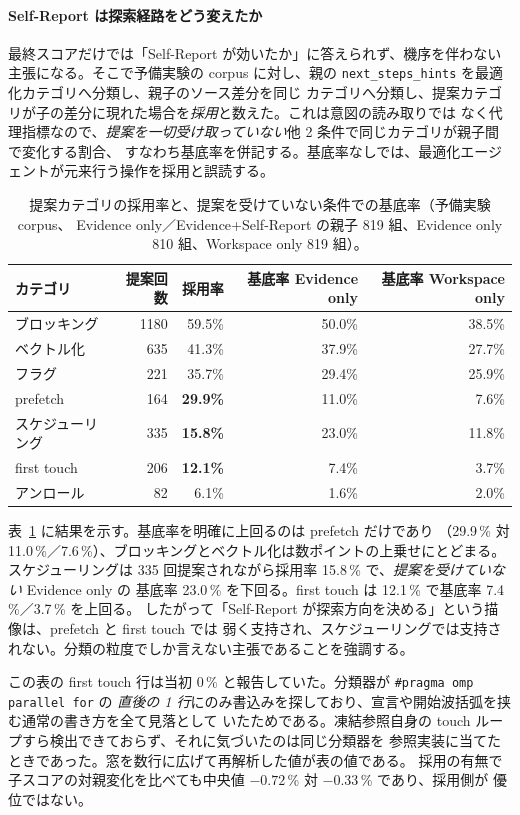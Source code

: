\documentclass[conference,letterpaper]{IEEEtran}
\newcommand{\armW}{Workspace only}
\newcommand{\armE}{Evidence only}
\newcommand{\armS}{Evidence+Self-Report}
\begin{document}
\paragraph{Self-Report は探索経路をどう変えたか}
最終スコアだけでは「Self-Report が効いたか」に答えられず、機序を伴わない主張になる。そこで予備実験の
corpus に対し、親の \texttt{next\_steps\_hints} を最適化カテゴリへ分類し、親子のソース差分を同じ
カテゴリへ分類し、提案カテゴリが子の差分に現れた場合を\emph{採用}と数えた。これは意図の読み取りでは
なく代理指標なので、\emph{提案を一切受け取っていない}他 2 条件で同じカテゴリが親子間で変化する割合、
すなわち基底率を併記する。基底率なしでは、最適化エージェントが元来行う操作を採用と誤読する。

\begin{table}[t]\centering\footnotesize
\caption{提案カテゴリの採用率と、提案を受けていない条件での基底率（予備実験 corpus、
\armE{}／\armS{} の親子 819 組、\armE{} 810 組、\armW{} 819 組）。}
\label{tab:trajectory}
\begin{tabular}{lrrrr}
\toprule
カテゴリ & 提案回数 & 採用率 & 基底率 \armE{} & 基底率 \armW{} \\
\midrule
ブロッキング   & 1180 & 59.5\% & 50.0\% & 38.5\% \\
ベクトル化     &  635 & 41.3\% & 37.9\% & 27.7\% \\
フラグ         &  221 & 35.7\% & 29.4\% & 25.9\% \\
prefetch       &  164 & \textbf{29.9\%} & 11.0\% & 7.6\% \\
スケジューリング &  335 & \textbf{15.8\%} & 23.0\% & 11.8\% \\
first touch    &  206 & \textbf{12.1\%} & 7.4\% & 3.7\% \\
アンロール     &   82 & 6.1\% & 1.6\% & 2.0\% \\
\bottomrule
\end{tabular}
\end{table}

表~\ref{tab:trajectory} に結果を示す。基底率を明確に上回るのは prefetch だけであり
（29.9\,\% 対 11.0\,\%／7.6\,\%）、ブロッキングとベクトル化は数ポイントの上乗せにとどまる。
スケジューリングは 335 回提案されながら採用率 15.8\,\% で、\emph{提案を受けていない} \armE{} の
基底率 23.0\,\% を下回る。first touch は 12.1\,\% で基底率 7.4\,\%／3.7\,\% を上回る。
したがって「Self-Report が探索方向を決める」という描像は、prefetch と first touch では
弱く支持され、スケジューリングでは支持されない。分類の粒度でしか言えない主張であることを強調する。

この表の first touch 行は当初 0\,\% と報告していた。分類器が \texttt{\#pragma omp parallel for} の
\emph{直後の 1 行}にのみ書込みを探しており、宣言や開始波括弧を挟む通常の書き方を全て見落として
いたためである。凍結参照自身の touch ループすら検出できておらず、それに気づいたのは同じ分類器を
参照実装に当てたときであった。窓を数行に広げて再解析した値が表の値である。
採用の有無で子スコアの対親変化を比べても中央値 $-0.72$\,\% 対 $-0.33$\,\% であり、採用側が
優位ではない。
\end{document}

